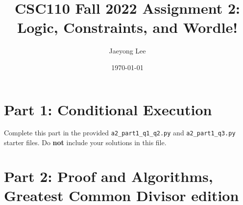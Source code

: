 \documentclass[11pt]{article}
\title{CSC110 Fall 2022 Assignment 2: Logic, Constraints, and Wordle!}
\author{Jaeyong Lee}
\date{\today}
\begin{document}
\maketitle

\section*{Part 1: Conditional Execution}

Complete this part in the provided \texttt{a2\_part1\_q1\_q2.py} and \texttt{a2\_part1\_q3.py} starter files.
Do \textbf{not} include your solutions in this file.

\section*{Part 2: Proof and Algorithms, Greatest Common Divisor edition}
\end{document}
